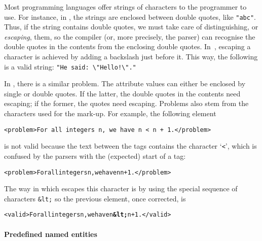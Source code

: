 Most programming languages offer strings of characters to the
programmer to use. For instance, in \Clang, the strings are enclosed
between double quotes, like \verb|"abc"|. Thus, if the string contains
double quotes, we must take care of distinguishing, or
\emph{escaping}, them, so the compiler (or, more precisely, the
parser) can recognise the double quotes in the contents from the
enclosing double quotes. In~\Clang, escaping a character is achieved
by adding a backslash just before it. This way, the following is a
valid \Clang string: \verb|"He said: \"Hello!\"."|

In \XML, there is a similar problem. The attribute values can either
be enclosed by single or double quotes. If the latter, the double
quotes in the contents need escaping; if the former, the quotes need
escaping. Problems also stem from the characters used for the
mark\hyp{}up. For example, the following element
\begin{verbatim}
<problem>For all integers n, we have n < n + 1.</problem>
\end{verbatim}
is not valid because the text between the tags contains the character
`\texttt{<}', which is confused by the \XML parsers with the
(expected) start of a tag:
\begin{alltt}
<problem>For all integers n, we have n \fbox{<\,} n + 1.</problem>
\end{alltt}
The way in which \XML escapes this character is by using the special
sequence of characters \verb|&lt;| so the previous element, once
corrected, is
\begin{alltt}
<valid>For all integers n, we have n \textbf{&lt;} n + 1.</valid>
\end{alltt}

\paragraph{Predefined named entities}

